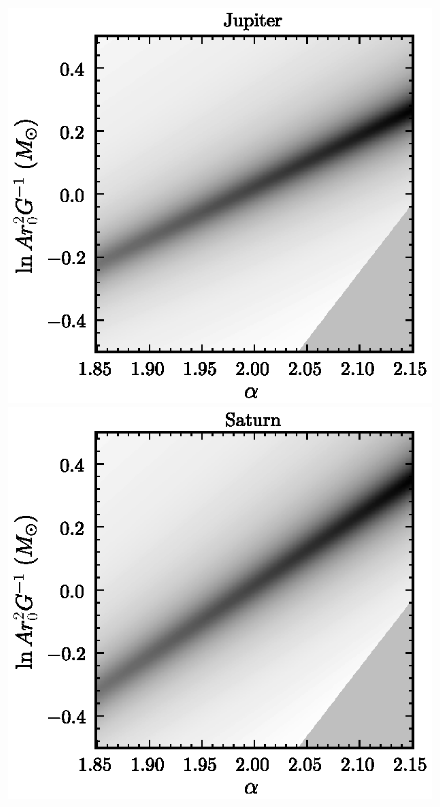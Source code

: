 \begin{figure}
\includegraphics[height=.2\textheight]{figs_solarsystem/jacobian_Jupiter.ps}
\includegraphics[height=.2\textheight]{figs_solarsystem/jacobian_Saturn.ps}\\[5pt]

\end{figure}
